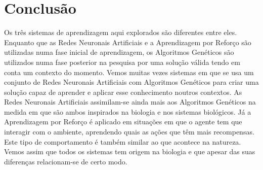 \section{Conclusão}\label{sec:Conclusion}

Os três sistemas de aprendizagem aqui explorados são diferentes entre eles. Enquanto que as Redes Neuronais Artificiais e a Aprendizagem por Reforço são utilizadas numa fase inicial de aprendizagem, os Algoritmos Genéticos são utilizados numa fase posterior na pesquisa por uma solução válida tendo em conta um contexto do momento.
Vemos muitas vezes sistemas em que se usa um conjunto de Redes Neuronais Artificiais com Algoritmos Genéticos para criar uma solução capaz de aprender e aplicar esse conhecimento noutros contextos.
As Redes Neuronais Artificiais assimilam-se ainda mais aos Algoritmos Genéticos na medida em que são ambos inspirados na biologia e nos sistemas biológicos. Já a Aprendizagem por Reforço é aplicado em situações em que o agente tem que interagir com o ambiente, aprendendo quais as ações que têm mais recompensas. Este tipo de comportamento é também similar ao que acontece na natureza.
Vemos assim que todos os sistemas tem origem na biologia e que apesar das suas diferenças relacionam-se de certo modo.